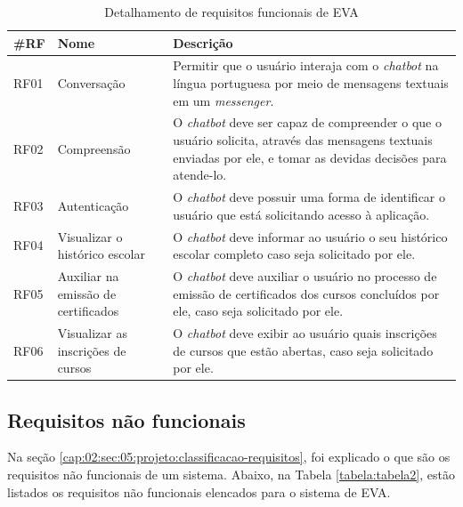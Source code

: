 \begin{table}[htb]
\caption{Detalhamento de requisitos funcionais de EVA}
\label{tabela:tabela1}
\centering
\medskip
\begin{tabular}{|p{1.2cm}|p{3.5cm}|p{7.5cm}|}
  \hline
   \textbf{\#RF} & \textbf{Nome}  & \textbf{Descrição}  \\
    \hline
    RF01 & Conversação & Permitir que o usuário interaja com o \textit{chatbot} na língua portuguesa por meio de mensagens textuais em um \textit{messenger}. \\
    \hline
    RF02 & Compreensão & O \textit{chatbot} deve ser capaz de compreender o que o usuário solicita, através das mensagens textuais enviadas por ele, e tomar as devidas decisões para atende-lo. \\
    \hline
    RF03 & Autenticação & O \textit{chatbot} deve possuir uma forma de identificar o usuário que está solicitando acesso à aplicação. \\
   \hline
     RF04 & Visualizar o histórico escolar & O \textit{chatbot} deve informar ao usuário o seu histórico escolar completo caso seja solicitado por ele. \\
   \hline
    RF05 & Auxiliar na emissão de certificados & O \textit{chatbot} deve auxiliar o usuário no processo de emissão de certificados dos cursos concluídos por ele, caso seja solicitado por ele. \\
   \hline
    RF06 & Visualizar as inscrições de cursos & O \textit{chatbot} deve exibir ao usuário quais inscrições de cursos que estão abertas, caso seja solicitado por ele. \\
   \hline
\end{tabular}
\end{table}

\subsection{Requisitos não funcionais}

Na seção \ref{cap:02:sec:05:projeto:classificacao-requisitos}, foi explicado o que são os requisitos não funcionais de um sistema. Abaixo, na Tabela \ref{tabela:tabela2}, estão listados os requisitos não funcionais elencados para o sistema de EVA.

